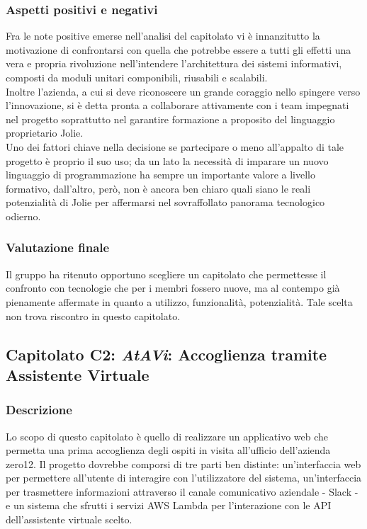 		\subsubsection{Aspetti positivi e negativi}
		Fra le note positive emerse nell'analisi del capitolato vi è innanzitutto la motivazione di confrontarsi con quella che potrebbe essere 
		a tutti gli effetti una vera e propria rivoluzione nell'intendere l'architettura dei sistemi informativi, composti da moduli unitari 
		componibili, riusabili e scalabili.\\
		Inoltre l'azienda, a cui si deve riconoscere un grande coraggio nello spingere verso l'innovazione, si è detta pronta a collaborare attivamente 
		con i team impegnati nel progetto soprattutto nel garantire formazione a proposito del linguaggio proprietario Jolie.\\
		Uno dei fattori chiave nella decisione se partecipare o meno all'appalto di tale progetto è proprio il suo uso; da un lato la necessità di 
		imparare un nuovo linguaggio di programmazione ha sempre un importante valore a livello formativo, dall'altro, però, non è ancora ben chiaro 
		quali siano le reali potenzialità di Jolie per affermarsi nel sovraffollato panorama tecnologico odierno.
		\subsubsection{Valutazione finale}
		Il gruppo \hx{} ha ritenuto opportuno scegliere un capitolato che permettesse il confronto con tecnologie che per i membri fossero nuove,
		ma al contempo già pienamente affermate in quanto a utilizzo, funzionalità, potenzialità. Tale scelta non trova riscontro in questo capitolato.
		
	\subsection{Capitolato C2: \emph{AtAVi}: Accoglienza tramite Assistente Virtuale}
		\subsubsection{Descrizione}
		Lo scopo di questo capitolato è quello di realizzare un applicativo web che permetta una prima accoglienza degli ospiti in visita all'ufficio 
		dell'azienda zero12. Il progetto dovrebbe comporsi di tre parti ben distinte: un'interfaccia web per permettere all'utente di interagire con 
		l'utilizzatore del sistema, un'interfaccia per trasmettere informazioni attraverso il canale comunicativo aziendale - Slack - e un sistema che 
		sfrutti i servizi AWS Lambda per l'interazione con le API dell'assistente virtuale scelto.
